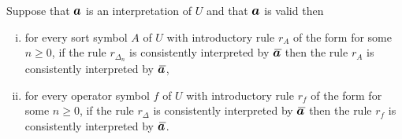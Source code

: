 \begin{lemma}
Suppose that $\iI$ is an interpretation of $U$  and that $\iI$ is valid  then 
\begin{enumerate}[(i)]
\item for every sort symbol $A$ of $U$ with introductory rule $r_A$ of the form  for some $n \geq 0$,
if the rule $r_{\Delta_n}$ is consistently interpreted by $\Ibar$ then the rule $r_A$ is consistently interpreted by $\Ibar$,
\item for every operator symbol $f$ of $U$ with introductory rule $r_f$ of the form  for some $n \geq 0$,
if the rule $r_{\Delta}$ is consistently interpreted by $\Ibar$ then the rule $r_f$ is consistently interpreted by $\Ibar$.
\end{enumerate}
\end{lemma}
